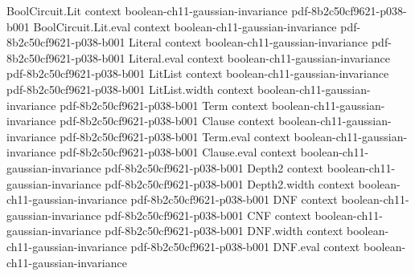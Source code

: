 \begin{theorem}
\label{BooleanAnalysis.GaussianSpace.invariance_levy}
\leanok
{}
\proofstep
  {BoolCircuit.Lit}
  {context}
  {boolean-ch11-gaussian-invariance}
  {pdf-8b2c50cf9621-p038-b001}
\proofstep
  {BoolCircuit.Lit.eval}
  {context}
  {boolean-ch11-gaussian-invariance}
  {pdf-8b2c50cf9621-p038-b001}
\proofstep
  {Literal}
  {context}
  {boolean-ch11-gaussian-invariance}
  {pdf-8b2c50cf9621-p038-b001}
\proofstep
  {Literal.eval}
  {context}
  {boolean-ch11-gaussian-invariance}
  {pdf-8b2c50cf9621-p038-b001}
\proofstep
  {LitList}
  {context}
  {boolean-ch11-gaussian-invariance}
  {pdf-8b2c50cf9621-p038-b001}
\proofstep
  {LitList.width}
  {context}
  {boolean-ch11-gaussian-invariance}
  {pdf-8b2c50cf9621-p038-b001}
\proofstep
  {Term}
  {context}
  {boolean-ch11-gaussian-invariance}
  {pdf-8b2c50cf9621-p038-b001}
\proofstep
  {Clause}
  {context}
  {boolean-ch11-gaussian-invariance}
  {pdf-8b2c50cf9621-p038-b001}
\proofstep
  {Term.eval}
  {context}
  {boolean-ch11-gaussian-invariance}
  {pdf-8b2c50cf9621-p038-b001}
\proofstep
  {Clause.eval}
  {context}
  {boolean-ch11-gaussian-invariance}
  {pdf-8b2c50cf9621-p038-b001}
\proofstep
  {Depth2}
  {context}
  {boolean-ch11-gaussian-invariance}
  {pdf-8b2c50cf9621-p038-b001}
\proofstep
  {Depth2.width}
  {context}
  {boolean-ch11-gaussian-invariance}
  {pdf-8b2c50cf9621-p038-b001}
\proofstep
  {DNF}
  {context}
  {boolean-ch11-gaussian-invariance}
  {pdf-8b2c50cf9621-p038-b001}
\proofstep
  {CNF}
  {context}
  {boolean-ch11-gaussian-invariance}
  {pdf-8b2c50cf9621-p038-b001}
\proofstep
  {DNF.width}
  {context}
  {boolean-ch11-gaussian-invariance}
  {pdf-8b2c50cf9621-p038-b001}
\proofstep
  {DNF.eval}
  {context}
  {boolean-ch11-gaussian-invariance}

\end{theorem}

